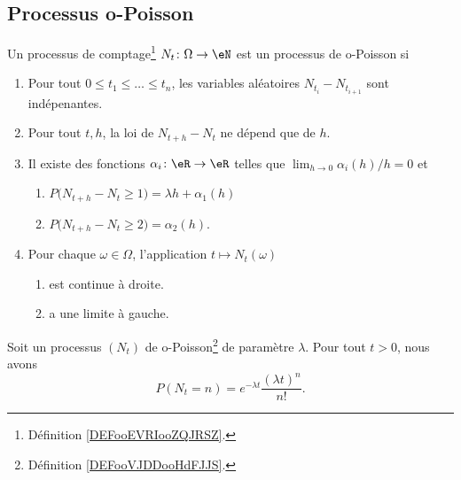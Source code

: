 \subsection{Processus o-Poisson}


\begin{definition}	\label{DEFooVJDDooHdFJJS}
	Un processus de comptage\footnote{Définition \ref{DEFooEVRIooZQJRSZ}.} \(N_t \colon \Omega\to \eN  \) est un processus de o-Poisson si
	\begin{enumerate}
		\item
		      Pour tout \( 0\leq t_1\leq \ldots \leq t_n\), les variables aléatoires \( N_{t_i}-N_{t_{i+1}}\) sont indépenantes.
		\item
		      Pour tout \( t,h\), la loi de \( N_{t+h}-N_t\) ne dépend que de \( h\).
		\item
		      Il existe des fonctions \(\alpha_i \colon  \eR\to \eR  \) telles que \( \lim_{h\to 0}\alpha_i(h)/h=0\) et
		      \begin{enumerate}
			      \item
			            \( P\big( N_{t+h}-N_t\geq 1 \big)=\lambda h+\alpha_1(h)\)
			      \item
			            \( P\big( N_{t+h}-N_t\geq 2 \big)=\alpha_2(h)\).
		      \end{enumerate}
		\item
		      Pour chaque \( \omega\in \Omega\), l'application \( t\mapsto N_t(\omega)\)
		      \begin{enumerate}
			      \item
			            est continue à droite.
			      \item
			            a une limite à gauche.
		      \end{enumerate}
	\end{enumerate}
\end{definition}


\begin{proposition}	\label{PROPooGXCPooHsJKMH}
	Soit un processus \( (N_t)\) de o-Poisson\footnote{Définition \ref{DEFooVJDDooHdFJJS}.} de paramètre \( \lambda\). Pour tout \( t>0\), nous avons
	\begin{equation}
		P(N_t=n)=e^{-\lambda t}\frac{ (\lambda t)^n }{ n! }.
	\end{equation}
\end{proposition}

